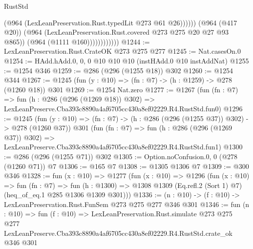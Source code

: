 \begin{lexlean}{RustStd}
\begin{coremodule}
                                (@964 (LexLeanPreservation.Rust.typedLit @273 @61 @26))))))
                        (@964 (@417 @20))
                        (@964 (LexLeanPreservation.Rust.covered @273 @275 @20 @27 @93 @865))
                        (@964 (@1111 @160))))))))))))
@1244 := LexLeanPreservation.Rust.CrateOK @273 @275 @277
@1245 := Nat.casesOn.{0}
@1254 := HAdd.hAdd.{0, 0, 0} @10 @10 @10 (instHAdd.{0} @10 instAddNat)
@1255 := @1254 @346
@1259 := @286 (@296 (@1255 @18)) @302
@1260 := @1254 @344
@1267 := @1245 (fun (y : @10) => (fn : @7) -> (h : @1259) -> @278 (@1260 @18)) @301
@1269 := @1254 Nat.zero
@1277 := @1267
    (fun (fn : @7) =>
    fun (h : @286 (@296 (@1269 @18)) @302) =>
    LexLeanPreserve.Cba393c8890a4af6705cc430a8ef02229.R4.RustStd.fun0)
@1296 := @1245
    (fun (y : @10) => (fn : @7) -> (h : @286 (@296 (@1255 @37)) @302) -> @278 (@1260 @37))
    @301
    (fun (fn : @7) =>
    fun (h : @286 (@296 (@1269 @37)) @302) =>
    LexLeanPreserve.Cba393c8890a4af6705cc430a8ef02229.R4.RustStd.fun1)
@1300 := @286 (@296 (@1255 @71)) @302
@1305 := Option.noConfusion.{0, 0} (@278 (@1260 @71)) @7
@1306 := @165 @7
@1308 := @1305 @1306 @7
@1309 := @300 @346
@1328 := fun (x : @10) =>
  @1277
    (fun (x : @10) =>
    @1296
      (fun (x : @10) =>
      fun (fn : @7) =>
      fun (h : @1300) =>
      @1308 @1309 (Eq.refl.{2} (Sort 1) @7) (heq_of_eq.{1} @285 @1306 @1309 @301)))
@1336 := (n : @10) -> (f : @10) -> LexLeanPreservation.Rust.FunSem @273 @275 @277 @346 @301
@1346 := fun (n : @10) =>
  fun (f : @10) =>
  LexLeanPreservation.Rust.simulate
    @273
    @275
    @277
    LexLeanPreserve.Cba393c8890a4af6705cc430a8ef02229.R4.RustStd.crate_ok
    @346
    @301
\end{coremodule}
\end{lexlean}
